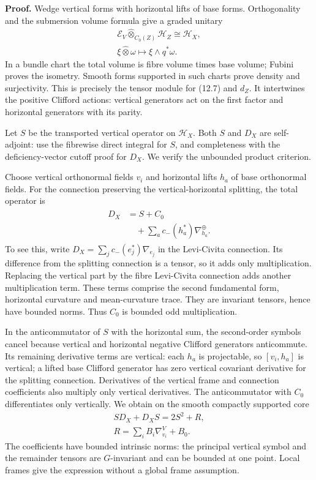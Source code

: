 \documentclass[
  11pt,
]{article}
\begin{document}
\textbf{Proof.} Wedge vertical forms with horizontal lifts of base
forms. Orthogonality and the submersion volume formula give a graded
unitary \[
\begin{gathered}
\mathcal E_V\widehat\otimes_{C_0(Z)}\mathcal H_Z
\cong\mathcal H_X,\\
\xi\widehat\otimes\omega
\longmapsto \xi\wedge q^*\omega.
\end{gathered}
\tag{12.9}
\] In a bundle chart the total volume is fibre volume times base volume;
Fubini proves the isometry. Smooth forms supported in such charts prove
density and surjectivity. This is precisely the tensor module for (12.7)
and \(d_Z\). It intertwines the positive Clifford actions: vertical
generators act on the first factor and horizontal generators with its
parity.

Let \(S\) be the transported vertical operator on \(\mathcal H_X\). Both
\(S\) and \(D_X\) are self-adjoint: use the fibrewise direct integral
for \(S\), and completeness with the deficiency-vector cutoff proof for
\(D_X\). We verify the unbounded product criterion.

Choose vertical orthonormal fields \(v_i\) and horizontal lifts \(h_a\)
of base orthonormal fields. For the connection preserving the
vertical-horizontal splitting, the total operator is \[
\begin{gathered}
\begin{aligned}
D_X&=S+C_0\\
&\quad+\sum_a c_-(h_a^*)\nabla^\oplus_{h_a}.
\end{aligned}
\end{gathered}
\tag{12.10}
\] To see this, write \(D_X=\sum_j c_-(e_j^*)\nabla_{e_j}\) in the
Levi-Civita connection. Its difference from the splitting connection is
a tensor, so it adds only multiplication. Replacing the vertical part by
the fibre Levi-Civita connection adds another multiplication term. These
terms comprise the second fundamental form, horizontal curvature and
mean-curvature trace. They are invariant tensors, hence have bounded
norms. Thus \(C_0\) is bounded odd multiplication.

In the anticommutator of \(S\) with the horizontal sum, the second-order
symbols cancel because vertical and horizontal negative Clifford
generators anticommute. Its remaining derivative terms are vertical:
each \(h_a\) is projectable, so \([v_i,h_a]\) is vertical; a lifted base
Clifford generator has zero vertical covariant derivative for the
splitting connection. Derivatives of the vertical frame and connection
coefficients also multiply only vertical derivatives. The anticommutator
with \(C_0\) differentiates only vertically. We obtain on the smooth
compactly supported core \[
\begin{gathered}
SD_X+D_XS=2S^2+R,\\
R=\sum_i B_i\nabla^V_{v_i}+B_0.
\end{gathered}
\tag{12.11}
\] The coefficients have bounded intrinsic norms: the principal vertical
symbol and the remainder tensors are \(G\)-invariant and can be bounded
at one point. Local frames give the expression without a global frame
assumption.
\end{document}
